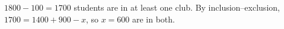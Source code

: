 $1800-100=1700$ students are in at least one club. By inclusion--exclusion, $1700=1400+900-x$, so $x=\boxed{600}$ are in both.

